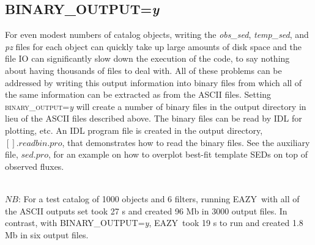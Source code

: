 \documentclass[11pt]{article}
\newcommand{\eazy}{\textsc{EAZY}}
\begin{document}
  \subsection{\textsc{BINARY\_OUTPUT}=\textsl{y}} \label{binary_output}
  
  For even modest numbers of catalog objects, writing the \textit{obs\_sed},
  \textit{temp\_sed}, and \textit{pz} files for each object can quickly take up
  large amounts of disk space and the file IO can significantly slow down the
  execution of the code, to say nothing about having thousands of files to deal
  with. All of these problems can be addressed by writing this output
  information into binary files from which all of the same information can be
  extracted as from the ASCII files.  Setting \textsc{binary\_output}=\textsl{y}
  will create a number of binary files in the output directory in lieu of the
  ASCII files described above.  The binary files can be read by IDL for
  plotting, etc.  An IDL program file is created in the output directory,
  $[].readbin.pro$, that demonstrates how to read the binary files.  See the
  auxiliary file, $sed.pro$, for an example on how to overplot best-fit template
  SEDs on top of observed fluxes.
  
  \ \\
  $NB$: For a test catalog of 1000 objects and 6 filters, running \eazy\ with all of
  the ASCII outputs set took 27 s and created 96 Mb in 3000 output files.  In
  contrast, with \textsc{BINARY\_OUTPUT}=\textsl{y}, \eazy\ took 19 s to run and
  created 1.8 Mb in six output files.
  
%
%
%    
\end{document}

